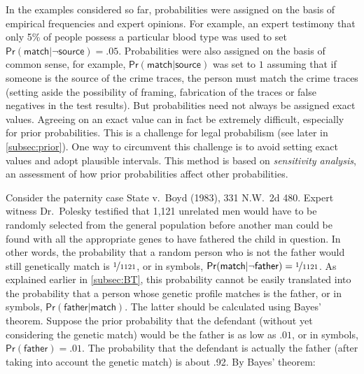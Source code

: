 \documentclass{article}
\newcommand{\pr}{\mathsf{Pr}}
\begin{document}
In the examples considered so far, probabilities were assigned on the basis of empirical frequencies and expert opinions. For example, an expert testimony that only 5\% of people possess a particular blood type was used to set $\pr(\textsf{match} \vert \neg \textsf{source})=.05$.  Probabilities were also assigned on the basis of common sense, for example, $\pr(\textsf{match} \vert \textsf{source})$ was set to $1$ assuming that if someone is the source of the crime traces, the person must match the crime traces (setting aside the possibility of framing,  fabrication of the traces or false negatives in the test results). 
%
%
But probabilities need not always be assigned exact values. Agreeing on an exact value can in fact be extremely difficult, especially for prior probabilities. 
This is a challenge for legal probabilism (see later in \ref{subsec:prior}). One way to circumvent this challenge is to avoid setting exact values and adopt plausible intervals. This method is based on \textit{sensitivity analysis}, an assessment of how prior probabilities affect other probabilities. 


Consider the paternity case State v.\ Boyd (1983), 331 N.W.\ 2d 480. Expert witness Dr.\ Polesky testified  that 1,121 unrelated men would have to be randomly selected from the general population before another man could be found with all the appropriate genes to have fathered the child in question. In other words, the  probability that a random person who is not the father would still genetically match is $\nicefrac{1}{1121}$, or in symbols, 
$\pr(\textsf{match}\vert \neg \textsf{father})=\nicefrac{1}{1121}$. As explained earlier in  \ref{subsec:BT}, this probability cannot be easily translated into the probability that a person whose genetic profile matches is  the father, or in symbols, $\pr(\textsf{father}\vert \textsf{match})$. The latter should be calculated using Bayes' theorem. %
Suppose the prior probability that the defendant (without yet considering 
the genetic match) would be the father is as low as $.01$,  or in symbols,  $\pr(\textsf{father})=.01$. 
The probability that the defendant is actually the father (after taking into account the genetic match) is 
about .92. By Bayes' theorem:
\end{document}
